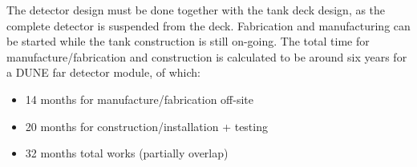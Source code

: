 The detector design must be done together with the tank deck design,
as the complete detector is suspended from the deck.  Fabrication and
manufacturing can be started while the tank construction is still
on-going.  The total time for manufacture/fabrication and construction
is calculated to be around six years for a DUNE far detector module, of which:
\begin{itemize}
\item{14 months		for manufacture/fabrication off-site}
\item{20 months		for construction/installation + testing}
\item{32 months		total works (partially overlap)}
\end{itemize}
